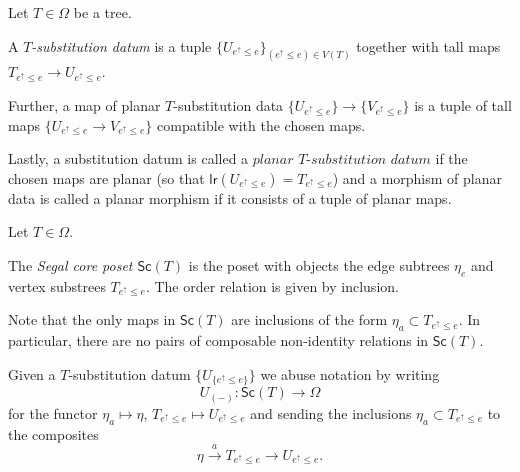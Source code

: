 \documentclass[a4paper,10pt]{article}%
\begin{document}
\begin{definition}\label{SUBSTITUTIONDATUM}
  Let $T \in \Omega$ be a tree.
  
  A \textit{$T$-substitution datum} is a tuple 
  $\{U_{e^{\uparrow} \leq e}\}_{(e^{\uparrow} \leq e)\in V(T)}$ together with tall maps
  $T_{e^{\uparrow}\leq e} \to U_{e^{\uparrow}\leq e}$.
  
  Further, a map of planar $T$-substitution data 
  $\{U_{e^{\uparrow} \leq e}\} \to \{V_{e^{\uparrow} \leq e}\}$ is a tuple of tall maps $\{U_{e^{\uparrow} \leq e}\to V_{e^{\uparrow} \leq e}\}$ compatible with the chosen maps.
  
  Lastly, a substitution datum is called a $\textit{planar $T$-substitution datum}$ if the chosen maps are planar (so that 
  $\mathsf{lr}(U_{e^{\uparrow} \leq e}) = T_{e^{\uparrow} \leq e}$) and a morphism of planar data is called a planar morphism if it consists of a tuple of planar maps.
\end{definition}

\begin{definition}
  Let $T \in \Omega$. 
  
  The \textit{Segal core poset $\mathsf{Sc}(T)$} is the poset with objects the edge subtrees $\eta_e$ and vertex substrees $T_{e^{\uparrow} \leq e}$. The order relation is given by inclusion.
\end{definition}

\begin{remark}
  Note that the only maps in $\mathsf{Sc}(T)$ are inclusions of the form $\eta_a \subset T_{e^{\uparrow}\leq e}$.
  In particular, there are no pairs of composable non-identity relations in $\mathsf{Sc}(T)$. 
\end{remark}

Given a $T$-substitution datum $\{U_{\{e^{\uparrow}\leq e\}}\}$ we abuse notation by writing
\[U_{(\minus)} \colon \mathsf{Sc}(T) \to \Omega\]
for the functor $\eta_a \mapsto \eta$, $T_{e^{\uparrow} \leq e} \mapsto U_{e^{\uparrow} \leq e}$  
and sending the inclusions $\eta_a \subset T_{e^{\uparrow} \leq e}$
to the composites
\[
\eta \xrightarrow{a} T_{e^{\uparrow} \leq e}  \to 
U_{e^{\uparrow} \leq e}.\]
\end{document}
